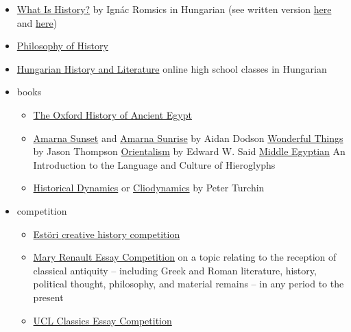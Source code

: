 \documentclass{article}
\begin{document}
\begin{itemize}
    \item \href{https://mindentudas.videotorium.hu/hu/recordings/8176/mi-a-tortenelem}{What Is History?} by Ignác Romsics in Hungarian (see written version \href{http://real-eod.mtak.hu/1022/1/04\%20Romsics\%20Ign\%C3\%A1c.pdf}{here} and \href{https://mindentudas.hu/el\%C5\%91ad\%C3\%A1sok/tudom\%C3\%A1nyter\%C3\%BCletek/b\%C3\%B6lcs\%C3\%A9szettudom\%C3\%A1ny/138-t\%C3\%B6rt\%C3\%A9nelemtudom\%C3\%A1nyok/6059-a-toertenetiro-dilemmaja-megismerjuek-vagy-csinaljuk-e-a-toertenelmet.html}{here})
    \item \href{https://www.britannica.com/topic/philosophy-of-history}{Philosophy of History}
    \item \href{https://www.youtube.com/channel/UCMFOiJn5wGreCszxZ9xuyTg/playlists}{Hungarian History and Literature} online high school classes in Hungarian
    \item books
    \begin{itemize}
        \item \href{https://www.goodreads.com/book/show/139310.The_Oxford_History_of_Ancient_Egypt}{The Oxford History of Ancient Egypt}
        \item \href{https://www.goodreads.com/book/show/6476537-amarna-sunset}{Amarna Sunset} and \href{https://www.goodreads.com/book/show/18798554-amarna-sunrise}{Amarna Sunrise} by Aidan Dodson
        \href{https://aucpress.com/product/wonderful-things/}{Wonderful Things} by Jason Thompson
        \href{https://www.goodreads.com/en/book/show/355190.Orientalism}{Orientalism} by Edward W. Said
        \href{https://www.cambridge.org/core/books/middle-egyptian/831CD0936A9DC45988F94B74C598353E}{Middle Egyptian} An Introduction to the Language and Culture of Hieroglyphs
        
        \item \href{https://www.goodreads.com/en/book/show/480002.Historical_Dynamics}{Historical Dynamics} or \href{https://www.nature.com/articles/488024a}{Cliodynamics} by Peter Turchin
    \end{itemize}
    \item competition
    \begin{itemize}
        \item \href{https://www.estori.hu/}{Estöri creative history competition}
        \item \href{https://www.st-hughs.ox.ac.uk/prospective-students/outreach-at-st-hughs/the-mary-renault-prize/}{Mary Renault Essay Competition} on a topic relating to the reception of classical antiquity – including Greek and Roman literature, history, political thought, philosophy, and material remains – in any period to the present
        \item \href{https://www.ucl.ac.uk/classics/outreach/essay-competition}{UCL Classics Essay Competition}
    \end{itemize}
\end{itemize}
\end{document}
